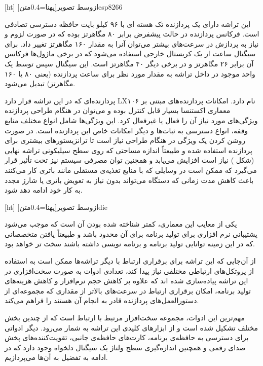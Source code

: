 
[ht]
‌ازوسط
‌تصویر[پهنا=0.4‌متن]{esp8266}

این تراشه دارای یک پردازنده تک هسته ای با ۹۶ کیلو بایت حافظه دسترسی تصادفی است. فرکانس پردازنده در حالت پیشفرض برابر ۸۰ مگاهرتز بوده که در صورت لزوم و نیاز به پردازش در سرعت‌های بیشتر می‌توان آنرا به مقدار ۱۶۰ مگاهرتز تغییر داد. برای سیگنال ساعت از یک کریستال خارجی استفاده می‌شود که در برخی ماژول‌ها فرکانس آن برابر ۲۶ مگاهرتز و در برخی دیگر ۴۰ مگاهرتز است. این سیگنال سپس توسط یک واحد  موجود در داخل تراشه به مقدار مورد نظر برای ساعت پردازنده (یعنی ۸۰ یا ۱۶۰ مگاهرتز) تبدیل می‌شود.

پردازنده‌ای که در این تراشه قرار دارد LX۱۰۶ نام دارد. امکانات پردازنده‌های مبتنی بر معماری اکستنسا بسیار قابل کنترل بوده و می‌توان در هنگام طراحی پردازنده ویژگی‌های مورد نیاز آن را فعال یا غیرفعال کرد. این ویژگی‌ها شامل انواع مختلف منابع وقفه، انواع دسترسی به ثبات‌ها و دیگر امکانات خاص این پردازنده است. در صورت روشن کردن یک ویژگی در هنگام طراحی نیاز است تا ترانزیستور‌های بیشتری برای پردازنده استفاده شده و طبیعتاً اندازه مساحتی که روی سطح سیلیکونی تراشه نهایی (شکل ) نیاز است افزایش می‌یابد و همچنین توان مصرفی سیستم نیز تحت تأثیر قرار می‌گیرد که ممکن است در وسایلی که با منابع تغذیه‌ی مستقلی مانند باتری کار می‌کنند باعث کاهش مدت زمانی که دستگاه می‌تواند بدون نیاز به تعویض باتری یا شارژ مجدد به کار خود ادامه دهد شود.

[ht]
‌ازوسط
‌تصویر[پهنا=0.4‌متن]{die}

یکی از معایب این معماری، کمتر شناخته شده بودن آن است که موجب می‌شود پشتیبانی نرم افزاری برای تولید برنامه برای آن محدود باشد و طبیعتاً یافتن متخصصانی که در این زمینه توانایی تولید برنامه و برنامه نویسی داشته باشند سخت تر خواهد بود.


از آن‌جایی که این تراشه برای برقراری ارتباط با دیگر تراشه‌ها ممکن است به استفاده از پروتکل‌های ارتباطی مختلفی نیاز پیدا کند، تعدادی ادوات به صورت سخت‌افزاری در این تراشه پیاده‌سازی شده اند که علاوه بر کاهش حجم نرم‌افزار و کاهش هزینه‌های تولید برنامه، امکان برقراری ارتباط در سرعت‌های بالاتر از مقداری که مجموعه‌ای از دستورالعمل‌های پردازنده قادر به انجام آن هستند را فراهم می‌کند.

مهم‌ترین این ادوات، مجموعه سخت‌افزار مرتبط با ارتباط  است که از چندین بخش مختلف تشکیل شده است و از ابزارهای کلیدی این تراشه به شمار می‌رود. دیگر ادواتی برای دسترسی به حافظه‌ی برنامه، کارت‌های حافظه‌ی جانبی، تقویت‌کننده‌های پخش صدای رقمی و همچنین اندازه‌گیری سطح ولتاژ یک سیگنال دلخواه وجود دارد که در ادامه به تفضیل به آن‌ها می‌پردازیم.

